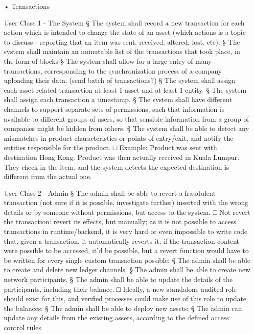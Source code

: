 {	• Transactions
		\par User Class 1 - The System
			§ The system shall record a new transaction for each action which is intended to change the state of an asset (which actions is a topic to discuss - reporting that an item was sent, received, altered, lost, etc).
			§ The system shall maintain an immutable list of the transactions that took place, in the form of blocks
			§ The system shall allow for a large entry of many transactions, corresponding to the synchronization process of a company uploading their data. (send batch of transactions?)
			§ The system shall assign each asset related transaction at least 1 asset and  at least 1 entity.
			§ The system shall assign each transaction a timestamp.
			§ The system shall have different channels to support separate sets of permissions, such that information is available to different groups of users, so that sensible information from a group of companies might be hidden from others.
			§ The system shall be able to detect any mismatches in product characteristics or points of entry/exit, and notify the entities responsible for the product.
				□ Example: Product was sent with destination Hong Kong. Product was then actually received in Kuala Lumpur. They check in the item, and the system detects the expected destination is different from the actual one.
		
		\par User Class 2 - Admin
			§ The admin shall be able to revert a fraudulent transaction (not sure if it is possible, investigate further) inserted with the wrong details or by someone without permissions, but access to the system.
				□ Not revert the transaction: revert its effects, but manually; as it is not possible to access transactions in runtime/backend, it is very hard or even impossible to write code that, given a transaction, it automatically reverts it; if the transaction content were possible to be accessed, it'd be possible, but a revert function would have to be written for every single custom transaction possible;
			§ The admin shall be able to create and delete new ledger channels.
			§ The admin shall be able to create new network participants.
			§ The admin shall be able to update the details of the participants, including their balance.
				□ Ideally, a new standalone audited role should exist for this, and verified processes could make use of this role to update the balances;
			§ The admin shall be able to deploy new assets;
			§ The admin can update any details from the existing assets, according to the defined access control rules
		
}
